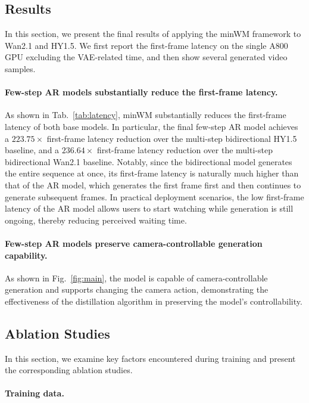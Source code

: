 \subsection{Results}
In this section, we present the final results of applying the minWM framework to Wan2.1 and HY1.5. We first report the first-frame latency on the single A800 GPU excluding the VAE-related time, and then show several generated video samples.


\paragraph{Few-step AR models substantially reduce the first-frame latency.
} As shown in Tab.~\ref{tab:latency}, minWM substantially reduces the first-frame latency of both base models. In particular, the final few-step AR model achieves a $223.75\times$ first-frame latency reduction over the multi-step bidirectional HY1.5 baseline, and a $236.64\times$ first-frame latency reduction over the multi-step bidirectional Wan2.1 baseline. Notably, since the bidirectional model generates the entire sequence at once, its first-frame latency is naturally much higher than that of the AR model, which generates the first frame first and then continues to generate subsequent frames. In practical deployment scenarios, the low first-frame latency of the AR model allows users to start watching while generation is still ongoing, thereby reducing perceived waiting time.


\paragraph{Few-step AR models preserve camera-controllable generation capability.} As shown in Fig.~\ref{fig:main}, the model is capable of camera-controllable generation and supports changing the camera action, demonstrating the effectiveness of the distillation algorithm in preserving the model's controllability.





\subsection{Ablation Studies}
\label{sec:ablation}
In this section, we examine key factors encountered during training and present the corresponding ablation studies.

\paragraph{Training data.}



